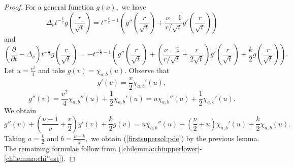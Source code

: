 \documentclass[12pt]{amsart}
\renewcommand{\1}{{\mathbf 1}}
\theoremstyle{others}
\numberwithin{equation}{section}
\begin{document}
\begin{proof}
For a general function $g(x),$ we have
\begin{equation}
\Delta_{\nu} t^{-\frac{k}{2} } g\left( \frac{r}{\sqrt{t}} \right)  = t^{- \frac{k}{2} - 1} \left( g''\left( \frac{r}{\sqrt{t}} \right) + \frac{\nu -1}{r/\sqrt{t}} g'\left( \frac{r}{\sqrt{t}} \right) \right)
\end{equation}
and
\begin{equation}
\left( \frac{\partial}{\partial t} - \Delta_{\nu} \right) t^{-\frac{k}{2} } g\left( \frac{r}{\sqrt{t}} \right) = -t^{- \frac{k}{2} - 1} \left( g''\left( \frac{r}{\sqrt{t}} \right) + \left( \frac{ \nu -1}{r/\sqrt{t}} + \frac{r}{2 \sqrt{t}} \right) g'\left( \frac{r}{\sqrt{t}} \right) + \frac{k}{2} g\left( \frac{r}{\sqrt{t}} \right) \right).
\end{equation}
Let $u = \frac{v^2}{4}$ and take $g(v) = \chi_{a,b}(u).$
Observe that
$$g'(v) = \frac{v}{2} \chi_{a,b}'(u) ,$$
$$g''(v) = \frac{v^2}{4} \chi_{a,b} ''(u) + \frac12 \chi_{a,b}' (u) = u \chi_{a,b}''(u) + \frac12 \chi_{a,b}'(u) .$$
We obtain
$$g''\left(v \right) + \left( \frac{\nu-1}{v} + \frac{v}{2} \right) g'\left( v\right) + \frac{k}{2} g\left( v \right) = u \chi_{a,b}''(u) + \left( \frac{\nu}{2} + u \right) \chi_{a,b}'(u) + \frac{k}{2}\chi_{a,b}(u). $$
Taking $a = \frac{k}{2}$ and $b = \frac{\nu - k}{2},$ we obtain (\ref{firstsupersol:pde}) by the previous lemma. The remaining formulae follow from (\ref{chilemma:chiupperlower}-\ref{chilemma:chi''est}).
\end{proof}
\end{document}
